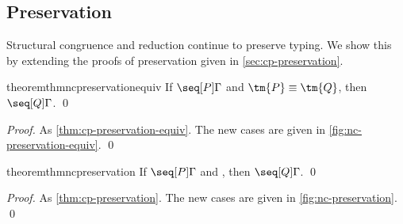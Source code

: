 \documentclass[UKenglish]{llncs}
\begin{document}
\subsection{Preservation}
\label{sec:nc-preservation}
Structural congruence and reduction continue to preserve typing.
We show this by extending the proofs of preservation given in
\cref{sec:cp-preservation}. 
\begin{restatable}{theorem}{thmncpreservationequiv}\label{thm:nc-preservation-equiv}
  If $\seq[{ P }]{ \Gamma }$ and $\tm{P} \equiv \tm{Q}$,
  then $\seq[{ Q }]{\Gamma }$.
  \qed
\end{restatable}
\begin{proof}
  As \cref{thm:cp-preservation-equiv}.
  The new cases are given in \cref{fig:nc-preservation-equiv}.
  \qed
\end{proof}

\begin{restatable}[Preservation]{theorem}{thmncpreservation}\label{thm:nc-preservation}
  If $\seq[{ P }]{ \Gamma }$ and ,
  then $\seq[{ Q }]{ \Gamma }$.
  \qed
\end{restatable}
\begin{proof}
  As \cref{thm:cp-preservation}.
  The new cases are given in \cref{fig:nc-preservation}.
  \qed
\end{proof}

\end{document}
